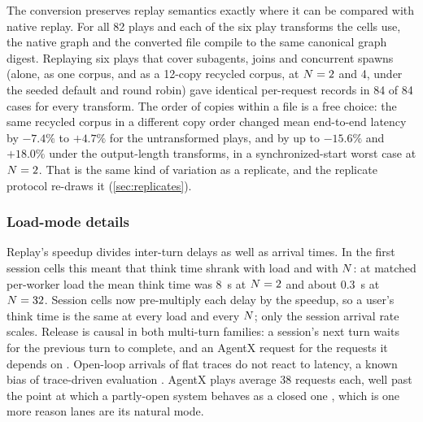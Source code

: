 The conversion preserves replay semantics exactly where it can be compared with native replay.
For all 82 plays and each of the six play transforms the cells use, the native graph and the
converted file compile to the same canonical graph digest. Replaying six plays that cover
subagents, joins and concurrent spawns (alone, as one corpus, and as a 12-copy recycled corpus,
at $N = 2$ and 4, under the seeded default and round robin) gave identical per-request records
in 84 of 84 cases for every transform.
The order of copies within a file is a free choice: the same recycled corpus in a different copy
order changed mean end-to-end latency by $-7.4\%$ to $+4.7\%$ for the untransformed plays, and by
up to $-15.6\%$ and $+18.0\%$ under the output-length transforms, in a synchronized-start worst
case at $N = 2$.
That is the same kind of variation as a replicate, and the replicate protocol re-draws it
(\cref{sec:replicates}).

\subsubsection{Load-mode details}

Replay's speedup divides inter-turn delays as well as arrival times. In the first session cells
this meant that think time shrank with load and with $N$: at matched per-worker load the mean
think time was \SI{8}{s} at $N = 2$ and about \SI{0.3}{s} at $N = 32$. Session cells now
pre-multiply each delay by the speedup, so a user's think time is the same at every load and
every $N$; only the session arrival rate scales. Release is causal in both multi-turn
families: a session's next turn waits for the previous turn to complete, and an AgentX request for
the requests it depends on \citep{rajib2026agentservesim}. Open-loop arrivals of flat traces do not
react to latency, a known bias of trace-driven evaluation \citep{alomar2023causalsim}.
AgentX plays average 38 requests each, well past the point at which a partly-open system behaves
as a closed one \citep{schroeder2006open}, which is one more reason lanes are its natural mode.

